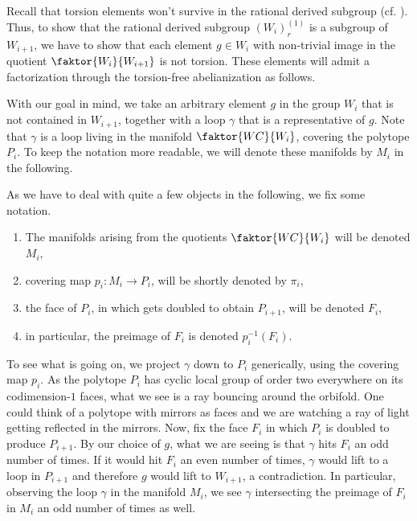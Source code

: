 \noindent
Recall that torsion elements won't survive in the rational derived subgroup (cf. ).
Thus, to show that the rational derived subgroup \((W_i)_r^{(1)}\) is a subgroup of \(W_{i+1}\), we have to show that each element \(g \in W_i\) with non-trivial image in the quotient \(\faktor{W_i}{W_{i+1}}\) is not torsion.
These elements will admit a factorization through the torsion-free abelianization as follows.
\begin{figure}[h!]
    \centering
\end{figure}

With our goal in mind, we take an arbitrary element \(g\) in the group \(W_i\) that is not contained in \(W_{i+1}\), together with a loop \(\gamma\) that is a representative of \(g\).
Note that \(\gamma\) is a loop living in the manifold \(\faktor{WC}{W_i}\), covering the polytope \(P_i\).
To keep the notation more readable, we will denote these manifolds by \(M_i\) in the following.

\begin{remark}
    As we have to deal with quite a few objects in the following, we fix some notation.
    \begin{enumerate}
        \item The manifolds arising from the quotients \(\faktor{WC}{W_i}\) will be denoted \(M_i\),
        \item covering map \(p_i: M_i \to P_i\), will be shortly denoted by \(\pi_i\),
        \item the face of \(P_i\), in which gets doubled to obtain \(P_{i+1}\), will be denoted \(F_i\),
        \item in particular, the preimage of \(F_i\) is denoted \(p_i^{-1}(F_i)\).
    \end{enumerate}
\end{remark}

To see what is going on, we project \(\gamma\) down to \(P_i\) generically, using the covering map \(p_i\). %
As the polytope \(P_i\) has cyclic local group of order two everywhere on its codimension-\(1\) faces, what we see is a ray bouncing around the orbifold. %
One could think of a polytope with mirrors as faces and we are watching a ray of light getting reflected in the mirrors.
Now, fix the face \(F_i\) in which \(P_i\) is doubled to produce \(P_{i+1}\).
By our choice of \(g\), what we are seeing is that \(\gamma\) hits \(F_i\) an odd number of times.
If it would hit \(F_i\) an even number of times, \(\gamma\) would lift to a loop in \(P_{i+1}\) and therefore \(g\) would lift to \(W_{i+1}\), a contradiction.
In particular, observing the loop \(\gamma\) in the manifold \(M_i\), we see \(\gamma\) intersecting the preimage of \(F_i\) in \(M_i\) an odd number of times as well.

